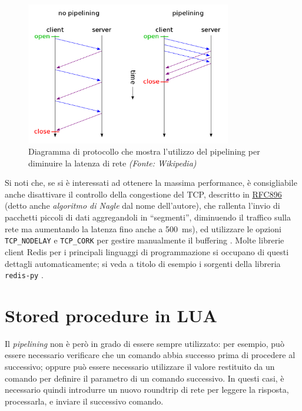 \begin{figure}
	\centering
		\includegraphics[width=0.8\textwidth]{img/pipelining}
	\caption{Diagramma di protocollo che mostra l'utilizzo del pipelining per diminuire la latenza
	di rete \emph{(Fonte: Wikipedia)}}
\end{figure}

Si noti che, se si è interessati ad ottenere la massima performance, è consigliabile anche
disattivare il controllo della congestione del TCP, descritto in
\href{https://tools.ietf.org/html/rfc896}{RFC896} (detto anche \emph{algoritmo di Nagle} dal nome
dell'autore), che rallenta l'invio di pacchetti piccoli di dati aggregandoli in ``segmenti'',
diminuendo il traffico sulla rete ma aumentando la latenza fino anche a \SI{500}{\milli\second}), ed
utilizzare le opzioni \verb|TCP_NODELAY| e \verb|TCP_CORK| per gestire manualmente il buffering
\cite{tcp-cork}. Molte librerie client Redis per i principali linguaggi di programmazione si
occupano di questi dettagli automaticamente; si veda a titolo di esempio i sorgenti della libreria
\verb|redis-py| \cite{tcp-cork-redispy}.

\section{Stored procedure in LUA}
\label{redislua}

Il \emph{pipelining} non è però in grado di essere sempre utilizzato: per esempio, può essere
necessario verificare che un comando abbia successo prima di procedere al successivo; oppure
può essere necessario utilizzare il valore restituito da un comando per definire il parametro 
di un comando successivo. In questi casi, è necessario quindi introdurre un nuovo roundtrip di
rete per leggere la risposta, processarla, e inviare il successivo comando.

